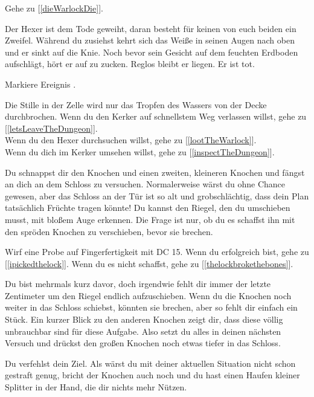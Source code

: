 Gehe zu [\ref{dieWarlockDie}].


Der Hexer ist dem Tode geweiht, daran besteht für keinen von euch beiden ein Zweifel. Während du zusiehst kehrt sich das Weiße in seinen Augen nach oben und er sinkt auf die Knie. Noch bevor sein Gesicht auf dem feuchten Erdboden aufschlägt, hört er auf zu zucken. Reglos bleibt er liegen. Er ist tot.

Markiere Ereignis .

Die Stille in der Zelle wird nur das Tropfen des Wassers von der Decke durchbrochen. Wenn du den Kerker auf schnellstem Weg verlassen willst, gehe zu [\ref{letsLeaveTheDungeon}].
\\Wenn du den Hexer durchsuchen willst, gehe zu [\ref{lootTheWarlock}].
\\Wenn du dich im Kerker umsehen willst, gehe zu [\ref{inspectTheDungeon}].


Du schnappst dir den Knochen und einen zweiten, kleineren Knochen und fängst an dich an dem Schloss zu versuchen. Normalerweise wärst du ohne Chance gewesen, aber das Schloss an der Tür ist so alt und grobschlächtig, dass dein Plan tatsächlich Früchte tragen könnte! Du kannst den Riegel, den du umschieben musst, mit bloßem Auge erkennen. Die Frage ist nur, ob du es schaffst ihn mit den spröden Knochen zu verschieben, bevor sie brechen.

Wirf eine Probe auf Fingerfertigkeit mit DC 15. Wenn du erfolgreich bist, gehe zu [\ref{ipickedthelock}]. Wenn du es nicht schaffst, gehe zu [\ref{thelockbrokethebones}].


Du bist mehrmals kurz davor, doch irgendwie fehlt dir immer der letzte Zentimeter um den Riegel endlich aufzuschieben. Wenn du die Knochen noch weiter in das Schloss schiebst, könnten sie brechen, aber so fehlt dir einfach ein Stück. Ein kurzer Blick zu den anderen Knochen zeigt dir, dass diese völlig unbrauchbar sind für diese Aufgabe. Also setzt du alles in deinen nächsten Versuch und drückst den großen Knochen noch etwas tiefer in das Schloss.

Du verfehlst dein Ziel. Als wärst du mit deiner aktuellen Situation nicht schon gestraft genug, bricht der Knochen auch noch und du hast einen Haufen kleiner Splitter in der Hand, die dir nichts mehr Nützen.

